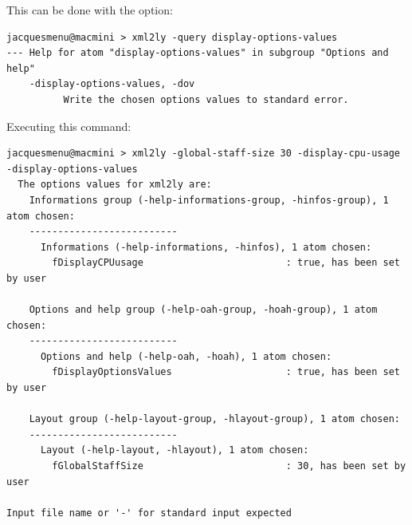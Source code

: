 This can be done with the  option:
\begin{lstlisting}[language=Terminal]
jacquesmenu@macmini > xml2ly -query display-options-values
--- Help for atom "display-options-values" in subgroup "Options and help"
    -display-options-values, -dov
          Write the chosen options values to standard error.
\end{lstlisting}

Executing this command:
\begin{lstlisting}[language=Terminal]
jacquesmenu@macmini > xml2ly -global-staff-size 30 -display-cpu-usage -display-options-values
  The options values for xml2ly are:
    Informations group (-help-informations-group, -hinfos-group), 1 atom chosen:
    --------------------------
      Informations (-help-informations, -hinfos), 1 atom chosen:
        fDisplayCPUusage                         : true, has been set by user

    Options and help group (-help-oah-group, -hoah-group), 1 atom chosen:
    --------------------------
      Options and help (-help-oah, -hoah), 1 atom chosen:
        fDisplayOptionsValues                    : true, has been set by user

    Layout group (-help-layout-group, -hlayout-group), 1 atom chosen:
    --------------------------
      Layout (-help-layout, -hlayout), 1 atom chosen:
        fGlobalStaffSize                         : 30, has been set by user

Input file name or '-' for standard input expected
\end{lstlisting}

